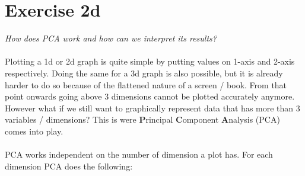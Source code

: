 \documentclass{article}
\begin{document}
\section{Exercise 2d}
\textit{How does PCA work and how can we interpret its results?}\\
\\
Plotting a 1d or 2d graph is quite simple by putting values on 1-axis and 2-axis respectively. Doing the same for a 3d graph is also possible, but it is already harder to do so because of the flattened nature of a screen / book. From that point onwards going above 3 dimensions cannot be plotted accurately anymore. However what if we still want to graphically represent data that has more than 3 variables / dimensions? This is were \textbf{P}rincipal \textbf{C}omponent \textbf{A}nalysis (PCA) comes into play. \\
\\
PCA works independent on the number of dimension a plot has. For each dimension PCA does the following: 
\end{document}
